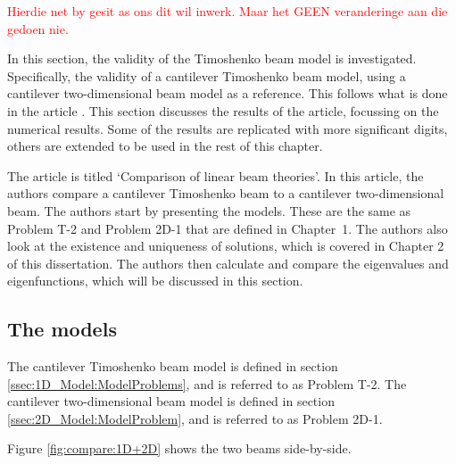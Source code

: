 	\textcolor{red}{Hierdie net by gesit as ons dit wil inwerk. Maar het GEEN veranderinge aan die gedoen nie.}

	In this section, the validity of the Timoshenko beam model is investigated. Specifically, the validity of a cantilever Timoshenko beam model, using a cantilever two-dimensional beam model as a reference. This follows what is done in the article \cite{LVV09}. This section discusses the results of the article, focussing on the numerical results. Some of the results are replicated with more significant digits, others are extended to be used in the rest of this chapter.

	The article \cite{LVV09} is titled `Comparison of linear beam theories'. In this article, the authors compare a cantilever Timoshenko beam to a cantilever two-dimensional beam. The authors start by presenting the models. These are the same as Problem T-2 and Problem 2D-1 that are defined in Chapter~1. The authors also look at the existence and uniqueness of solutions, which is covered in Chapter 2 of this dissertation. The authors then calculate and compare the eigenvalues and eigenfunctions, which will be discussed in this section.

	\subsection{The models}
	The cantilever Timoshenko beam model is defined in section \ref{ssec:1D_Model:ModelProblems}, and is referred to as Problem T-2. The cantilever two-dimensional beam model is defined in section \ref{ssec:2D_Model:ModelProblem}, and is referred to as Problem 2D-1.

	Figure \ref{fig:compare:1D+2D} shows the two beams side-by-side.

